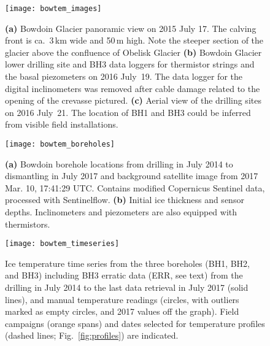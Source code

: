 \documentclass[utf8]{article}
\begin{document}
    \begin{figure}
      \centerline{\texttt{[image: bowtem\_images]}}
      \caption{%
        \textbf{(a)} Bowdoin Glacier panoramic view on 2015 July 17. The
          calving front is ca.~3\,km wide and 50\,m high. Note the steeper
          section of the glacier above the confluence of Obelisk Glacier
        \textbf{(b)} Bowdoin Glacier lower drilling site and BH3 data loggers
          for thermistor strings and the basal piezometers on 2016 July~19. The
          data logger for the digital inclinometers was removed after cable
          damage related to the opening of the crevasse pictured.
        \textbf{(c)} Aerial view of the drilling sites on 2016 July~21. The
          location of BH1 and BH3 could be inferred from visible field
          installations.}
      \label{fig:images}
    \end{figure}

    \begin{figure}
      \centerline{\texttt{[image: bowtem\_boreholes]}}
      \caption{%
        \textbf{(a)} Bowdoin borehole locations from drilling in July 2014 to
          dismantling in July 2017 and background satellite image from 2017
          Mar. 10, 17:41:29 UTC. Contains modified Copernicus Sentinel data,
          processed with Sentinelflow.
        \textbf{(b)} Initial ice thickness and sensor depths. Inclinometers
          and piezometers are also equipped with thermistors.}
      \label{fig:boreholes}
    \end{figure}

    \begin{figure}
      \centerline{\texttt{[image: bowtem\_timeseries]}}
      \caption{%
        Ice temperature time series from the three boreholes (BH1, BH2, and
        BH3) including BH3 erratic data (ERR, see text) from the drilling in
        July 2014 to the last data retrieval
        in July 2017 (solid lines), and manual temperature readings (circles,
        with outliers marked as empty circles, and 2017 values off the graph).
        Field campaigns (orange spans) and dates selected for
        temperature profiles (dashed lines; Fig.~\ref{fig:profiles}) are
        indicated.}
      \label{fig:timeseries}
    \end{figure}
\end{document}

